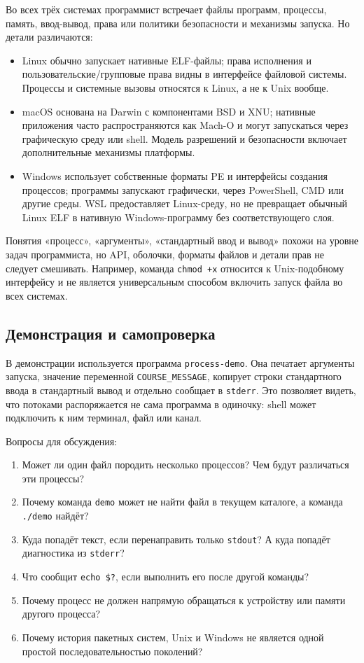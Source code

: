 Во всех трёх системах программист встречает файлы программ, процессы, память,
ввод-вывод, права или политики безопасности и механизмы запуска. Но детали
различаются:
\begin{itemize}
  \item Linux обычно запускает нативные ELF-файлы; права исполнения и
        пользовательские/групповые права видны в интерфейсе файловой системы.
        Процессы и системные вызовы относятся к Linux, а не к Unix вообще.
  \item macOS основана на Darwin с компонентами BSD и XNU; нативные приложения
        часто распространяются как Mach-O и могут запускаться через графическую
        среду или shell. Модель разрешений и безопасности включает дополнительные
        механизмы платформы.
  \item Windows использует собственные форматы PE и интерфейсы создания
        процессов; программы запускают графически, через PowerShell, CMD или
        другие среды. WSL предоставляет Linux-среду, но не превращает обычный
        Linux ELF в нативную Windows-программу без соответствующего слоя.
\end{itemize}

Понятия «процесс», «аргументы», «стандартный ввод и вывод» похожи на уровне
задач программиста, но API, оболочки, форматы файлов и детали прав не следует
смешивать. Например, команда \texttt{chmod +x} относится к Unix-подобному
интерфейсу и не является универсальным способом включить запуск файла во всех
системах.

\subsection{Демонстрация и самопроверка}

В демонстрации используется программа \texttt{process-demo}. Она печатает
аргументы запуска, значение переменной \texttt{COURSE\_MESSAGE}, копирует
строки стандартного ввода в стандартный вывод и отдельно сообщает в
\texttt{stderr}. Это позволяет видеть, что потоками распоряжается не сама
программа в одиночку: shell может подключить к ним терминал, файл или канал.

Вопросы для обсуждения:
\begin{enumerate}
  \item Может ли один файл породить несколько процессов? Чем будут различаться
        эти процессы?
  \item Почему команда \texttt{demo} может не найти файл в текущем каталоге,
        а команда \texttt{./demo} найдёт?
  \item Куда попадёт текст, если перенаправить только \texttt{stdout}? А куда
        попадёт диагностика из \texttt{stderr}?
  \item Что сообщит \texttt{echo \$?}, если выполнить его после другой команды?
  \item Почему процесс не должен напрямую обращаться к устройству или памяти
        другого процесса?
  \item Почему история пакетных систем, Unix и Windows не является одной
        простой последовательностью поколений?
\end{enumerate}

